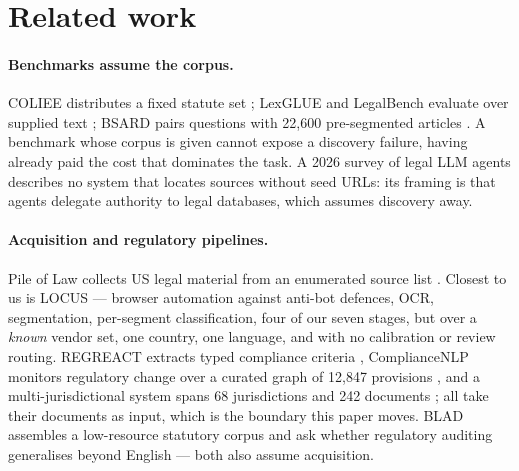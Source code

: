\documentclass{article}
\begin{document}
\section{Related work}
\label{sec:related}

\paragraph{Benchmarks assume the corpus.} COLIEE distributes a fixed statute set
\citep{goebel2023coliee}; LexGLUE and LegalBench evaluate over supplied text
\citep{chalkidis2022lexglue,guha2023legalbench}; BSARD pairs questions with
22{,}600 pre-segmented articles \citep{louis2022bsard}. A benchmark whose corpus
is given cannot expose a discovery failure, having already paid the cost that
dominates the task. A 2026 survey of legal LLM agents \citep{liu2026legalagents}
describes no system that locates sources without seed URLs: its framing is that
agents delegate authority to legal databases, which assumes discovery away.

\paragraph{Acquisition and regulatory pipelines.} Pile of Law collects US legal
material from an enumerated source list \citep{henderson2022pileoflaw}. Closest
to us is LOCUS \citep{peskoff2026locus} --- browser automation against anti-bot
defences, OCR, segmentation, per-segment classification, four of our seven
stages, but over a \emph{known} vendor set, one country, one language, and with
no calibration or review routing. REGREACT extracts typed compliance criteria
\citep{ali2026regreact}, ComplianceNLP monitors regulatory change over a curated
graph of 12{,}847 provisions \citep{guo2026compliancenlp}, and a
multi-jurisdictional system spans 68 jurisdictions and 242 documents
\citep{ford2026multijurisdictional}; all take their documents as input, which is
the boundary this paper moves. BLAD assembles a low-resource statutory corpus
\citep{sakhawat2026blad} and \citet{moran2026multilingual} ask whether regulatory
auditing generalises beyond English --- both also assume acquisition.
\end{document}
